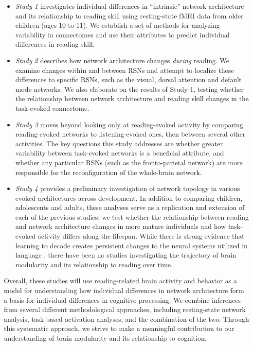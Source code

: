 \begin{itemize}

    \item \textit{Study 1} investigates individual differences in ``intrinsic'' network architecture and its relationship to reading skill using resting-state fMRI data from older children (ages 10 to 11). We establish a set of methods for analyzing variability in connectomes and use their attributes to predict individual differences in reading skill. 

    \item \textit{Study 2} describes how network architecture changes \textit{during} reading. We examine changes within and between RSNs and attempt to localize these differences to specific RSNs, such as the visual, dorsal attention and default mode networks. We also elaborate on the results of Study 1, testing whether the relationship between network architecture and reading skill changes in the task-evoked connectome. 

    \item \textit{Study 3} moves beyond looking only at reading-evoked activity by  comparing reading-evoked networks to listening-evoked ones, then between several other activities. The key questions this study addresses are whether greater variability between task-evoked networks is a beneficial attribute, and whether any particular RSNs (such as the fronto-parietal network) are more responsible for the reconfiguration of the whole-brain network.

    \item \textit{Study 4} provides a preliminary investigation of network topology in various evoked architectures across development. In addition to comparing children, adolescents and adults, these analyses serve as a replication and extension of each of the previous studies: we test whether the relationship between reading and network architecture changes in more mature individuals and how task-evoked activity differs along the lifespan. While there is strong evidence that learning to decode creates persistent changes to the neural systems utilized in language \citep{Schlaggar2007}, there have been no studies investigating the trajectory of brain modularity and its relationship to reading over time.

\end{itemize}

Overall, these studies will use reading-related brain activity and behavior as a model for understanding how individual differences in network architecture form a basis for individual differences in cognitive processing. We combine inferences from several different methodological approaches, including resting-state network analysis, task-based activation analyses, and the combination of the two. Through this systematic approach, we strive to make a meaningful contribution to our understanding of brain modularity and its relationship to cognition.